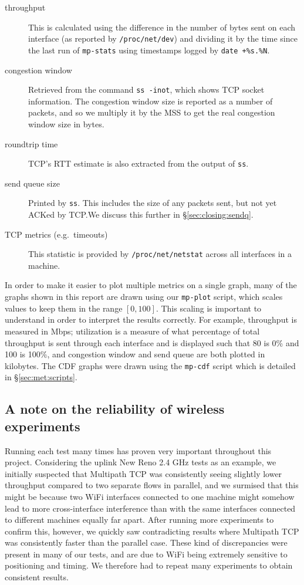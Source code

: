 \begin{description}
  \item[throughput]
    This is calculated using the difference in the number of bytes sent on each
    interface (as reported by \texttt{/proc\-/net/\-dev}) and dividing it by the
    time since the last run of \texttt{mp-stats} using timestamps logged by
    \texttt{date +\%s.\%N}.
  \item[congestion window]
    Retrieved from the command \texttt{ss -inot}, which shows TCP socket
    information. The congestion window size is reported as a number of packets,
    and so we multiply it by the MSS to get the real congestion window size in
    bytes.
  \item[roundtrip time]
    TCP's RTT estimate is also extracted from the output of \texttt{ss}.
  \item[send queue size]
    Printed by \texttt{ss}. This includes the size of any packets sent, but not
    yet ACKed by TCP.\@ We discuss this further in \S\ref{sec:closing:sendq}.
  \item[TCP metrics (e.g.\ timeouts)]
    This statistic is provided by \texttt{/proc\-/net/\-netstat} across all
    interfaces in a machine.
\end{description}

In order to make it easier to plot multiple metrics on a single graph, many of
the graphs shown in this report are drawn using our \texttt{mp-plot} script,
which scales values to keep them in the range $[0,100]$. This scaling is
important to understand in order to interpret the results correctly. For
example, throughput is measured in Mbps; utilization is a measure of what
percentage of total throughput is sent through each interface and is displayed
such that 80 is 0\% and 100 is 100\%, and congestion window and send queue are
both plotted in kilobytes. The CDF graphs were drawn using the \texttt{mp-cdf}
script which is detailed in \S\ref{sec:met:scripts}.

\subsection{A note on the reliability of wireless experiments}
Running each test many times has proven very important throughout this project.
Considering the uplink New Reno 2.4 GHz tests as an example, we initially
suspected that Multipath TCP was consistently seeing slightly lower throughput
compared to two separate flows in parallel, and we surmised that this might be
because two WiFi interfaces connected to one machine might somehow lead to more
cross-interface interference than with the same interfaces connected to
different machines equally far apart. After running more experiments to confirm
this, however, we quickly saw contradicting results where Multipath TCP was
consistently faster than the parallel case. These kind of discrepancies were
present in many of our tests, and are due to WiFi being extremely sensitive to
positioning and timing. We therefore had to repeat many experiments to obtain
consistent results.
